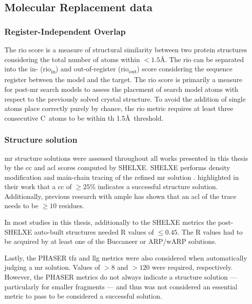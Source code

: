 \subsection{Molecular Replacement data}
\subsubsection{Register-Independent Overlap}
The \gls{rio} score \cite{Thomas2015-wu} is a measure of structural similarity between two protein structures considering the total number of atoms within $<1.5$\AA. The \gls{rio} can be separated into the in- (\gls{rio}\textsubscript{in}) and out-of-register (\gls{rio}\textsubscript{out}) score considering the sequence register between the model and the target. The \gls{rio} score is primarily a measure for post-\gls{mr} search models to assess the placement of search model atoms with respect to the previously solved crystal structure. To avoid the addition of single atoms place correctly purely by chance, the \gls{rio} metric requires at least three consecutive C\textalpha\ atoms to be within th 1.5\AA\ threshold.

\subsubsection{Structure solution} \label{sec:methods_mr_success}

\gls{mr} structure solutions were assessed throughout all works presented in this thesis by the \gls{cc} \cite{Fujinaga1987-vh} and \gls{acl} scores computed by SHELXE. SHELXE performs density modification and main-chain tracing of the refined \gls{mr} solution \cite{Thorn2013-le}. \textcite{Thorn2013-le} highlighted in their work that a \gls{cc} of $\geq25$\% indicates a successful structure solution. Additionally, previous research with \gls{ample} \cite{Thomas2015-wu} has shown that an \gls{acl} of the trace needs to be $\geq10$ residues.

In most studies in this thesis, additionally to the SHELXE metrics the post-SHELXE auto-built structures needed R values of $\leq0.45$. The R values had to be acquired by at least one of the Buccaneer \cite{Cowtan2006-xv} or ARP/wARP \cite{Cohen2007-wg} solutions.

Lastly, the PHASER \gls{tfz} and \gls{llg} metrics were also considered when automatically judging a \gls{mr} solution. Values of $>8$ and $>120$ were required, respectively. However, the PHASER metrics do not always indicate a structure solution --- particularly for smaller fragments --- and thus was not considered an essential metric to pass to be considered a successful solution.

